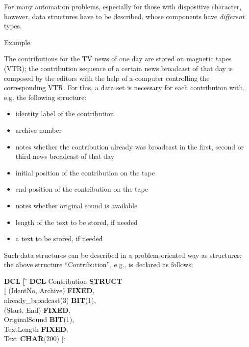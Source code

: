 For many automation problems, especially for those with dispositive
character, however, data structures have to be described, whose
components have {\it different} types.

Example:

The contributions for the TV news of one day are stored on magnetic
tapes (VTR); the contribution sequence of a certain news broadcast of
that day is composed by the editors with the help of a computer
controlling the corresponding VTR. For this, a data set is necessary for
each contribution with, e.g. the following structure:

\begin{itemize}
\item identity label of the contribution
\item archive number
\item notes whether the contribution already was broadcast in the first,
second or third news broadcast of that day
\item initial position of the contribution on the tape
\item end position of the contribution on the tape
\item notes whether original sound is available
\item length of the text to be stored, if needed
\item a text to be stored, if needed
\end{itemize}

Such data structures can be described in a problem oriented way as
structures; the above structure ``Contribution'', e.g., is declared as
follows:

\begin{tabbing}
{\bf DCL} \= {\bf [} \= \kill
{\bf DCL} \>         \> Contribution {\bf STRUCT} \\
          \> {\bf [} \> (IdentNo, Archive) {\bf FIXED},\\
          \>         \> already\_broadcast(3) {\bf BIT}(1),\\
          \>         \> (Start, End) {\bf FIXED},\\
          \>         \> OriginalSound {\bf BIT}(1),\\
          \>         \> TextLength {\bf FIXED},\\
          \>         \> Text {\bf CHAR}(200) {\bf ]};
\end{tabbing}


